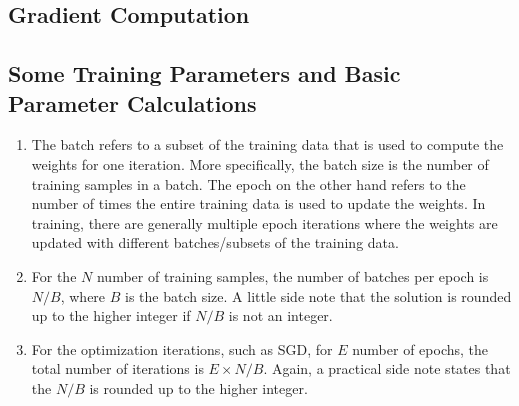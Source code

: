 \documentclass[3p,times,procedia]{elsarticle}
\begin{document}

\subsection{\textbf{Gradient Computation}}
\subsection{\textbf{Some Training Parameters and Basic Parameter Calculations}}
\begin{enumerate}
    \item The batch refers to a subset of the training data that is used to compute the weights for one iteration. More specifically, the batch size is the number of training samples in a batch.
 The epoch on the other hand refers to the number of times the entire training data is used to update the weights. In training, there are generally multiple epoch iterations where the weights are updated with different batches/subsets of the training data.
    \item For the $N$ number of training samples, the number of batches per epoch is $N/B$, where $B$ is the batch size. A little side note that the solution is rounded up to the higher integer if $N/B$ is not an integer.
    \item For the optimization iterations, such as SGD, for $E$ number of epochs, the total number of iterations is $E \times N/B$. Again, a practical side note states that the $N/B$ is rounded up to the higher integer.
\end{enumerate}
\end{document}
